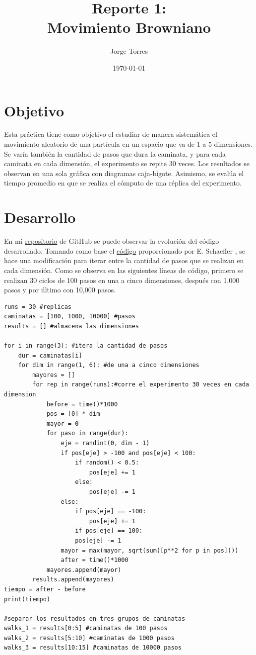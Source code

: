 \documentclass{article}
\title{Reporte 1:\\Movimiento Browniano}
\author{Jorge Torres}
\date{\today}
\begin{document}
\maketitle

\section{Objetivo}
Esta pr\'actica tiene como objetivo el estudiar de manera sistem\'atica el movimiento aleatorio de una part\'icula en un espacio que va de 1 a 5 dimensiones. Se var\'ia tambi\'en la cantidad de pasos que dura la caminata, y para cada caminata en cada dimensi\'on, el experimento se repite 30 veces. Los resultados se observan en una sola gr\'afica con diagramas caja-bigote. Asimismo, se eval\'ua el tiempo promedio en que se realiza el c\'omputo de una r\'eplica del experimento.

\section{Desarrollo}
En mi \href{https://github.com/FeroxDeitas/Simulacion-Nano/tree/main/Tareas/P1}{repositorio} de GitHub se puede observar la evoluci\'on del c\'odigo desarrollado. Tomando como base el \href{https://github.com/satuelisa/Simulation/blob/master/BrownianMotion/sinpar.py}{c\'odigo} proporcionado por E. Schaeffer \cite{elisa1}, se hace una modificaci\'on para iterar entre la cantidad de pasos que se realizan en cada dimensi\'on. Como se observa en las siguientes l\'ineas de c\'odigo, primero se realizan 30 ciclos de 100 pasos en una a cinco dimensiones, despu\'es con 1,000 pasos y por \'ultimo con 10,000 pasos.

\begin{lstlisting}
runs = 30 #replicas
caminatas = [100, 1000, 10000] #pasos
results = [] #almacena las dimensiones

for i in range(3): #itera la cantidad de pasos
    dur = caminatas[i]
    for dim in range(1, 6): #de una a cinco dimensiones
        mayores = []
        for rep in range(runs):#corre el experimento 30 veces en cada dimension
            before = time()*1000
            pos = [0] * dim
            mayor = 0
            for paso in range(dur):
                eje = randint(0, dim - 1)
                if pos[eje] > -100 and pos[eje] < 100:
                    if random() < 0.5:
                        pos[eje] += 1
                    else:
                        pos[eje] -= 1
                else:
                    if pos[eje] == -100:
                        pos[eje] += 1
                    if pos[eje] == 100:
                    pos[eje] -= 1
                mayor = max(mayor, sqrt(sum([p**2 for p in pos])))
                after = time()*1000
            mayores.append(mayor)
        results.append(mayores)
tiempo = after - before
print(tiempo)

#separar los resultados en tres grupos de caminatas
walks_1 = results[0:5] #caminatas de 100 pasos
walks_2 = results[5:10] #caminatas de 1000 pasos
walks_3 = results[10:15] #caminatas de 10000 pasos
\end{lstlisting}
\end{document}
